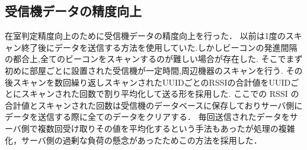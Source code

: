 
\subsection{受信機データの精度向上}
在室判定精度向上のために受信機データの精度向上を行った．
以前は1度のスキャン終了後にデータを送信する方法を使用していた.しかしビーコンの発進間隔の都合上,全てのビーコンをスキャンするのが難しい場合が存在した.
そこでまず初めに部屋ごとに設置された受信機が一定時間,周辺機器のスキャンを行う.
その後スキャンを数回繰り返しスキャンされたUUIDごとのRSSIの合計値をUUIDごとにスキャンされた回数で割り平均化して送る形を採用した.
ここでの RSSI の合計値とスキャンされた回数は受信機のデータベースに保存しておりサーバ側にデータを送信する際に全てのデータをクリアする．
毎回送信されたデータをサーバ側で複数回受け取りその値を平均化するという手法もあったが処理の複雑化，サーバ側の過剰な負荷の懸念があったためこの方法を採用した．